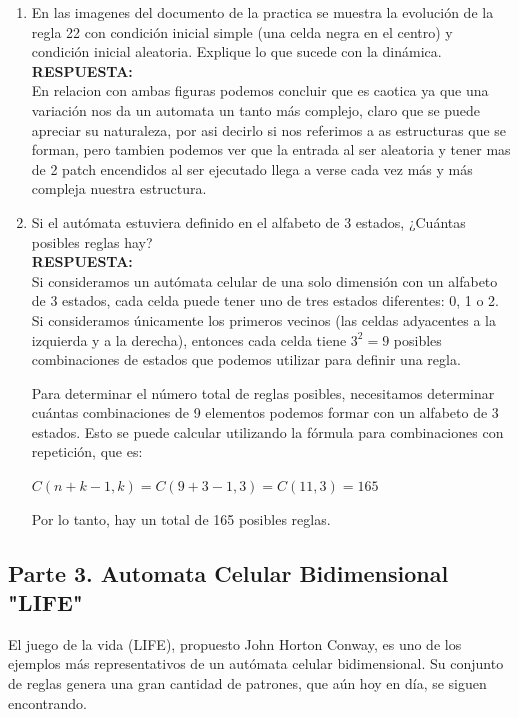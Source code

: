\documentclass[12pt]{article}
\begin{document}
\begin{enumerate}
    \item En las imagenes del documento de la practica se muestra la evolución de la regla 22 con condición inicial simple (una celda negra en el centro) y
    condición inicial aleatoria. Explique lo que sucede con la dinámica.\\
    \textbf{\color{red} RESPUESTA:}\\
    En relacion con ambas figuras podemos concluir que es caotica ya que una variación nos da un automata un tanto más complejo, claro que se puede apreciar su naturaleza, por asi decirlo si nos referimos a as estructuras que se forman,
    pero tambien podemos ver que la entrada al ser aleatoria y tener mas de 2 patch encendidos al ser ejecutado llega a verse cada vez más y más compleja nuestra estructura.

    \item Si el autómata estuviera definido en el alfabeto de 3 estados, ¿Cuántas posibles reglas hay?\\
    \textbf{\color{red} RESPUESTA:}\\
    Si consideramos un autómata celular de una solo dimensión con un alfabeto de 3 estados, cada celda puede tener uno de tres estados diferentes: 0, 1 o 2.
    Si consideramos únicamente los primeros vecinos (las celdas adyacentes a la izquierda y a la derecha), entonces cada celda tiene $3^2 = 9$ posibles combinaciones de estados que podemos utilizar para definir una regla.

Para determinar el número total de reglas posibles, necesitamos determinar cuántas combinaciones de 9 elementos podemos formar con un alfabeto de 3 estados. Esto se puede calcular utilizando la fórmula para combinaciones con repetición, que es:

$C(n + k - 1, k) = C(9 + 3 - 1, 3) = C(11, 3) = 165$

Por lo tanto, hay un total de 165 posibles reglas. 
\end{enumerate}

{\color{blue} \subsection*{Parte 3. Automata Celular Bidimensional "LIFE" }}
\vspace{1em}

El juego de la vida (LIFE), propuesto John Horton Conway, es uno de los
ejemplos más representativos de un autómata celular bidimensional. Su
conjunto de reglas genera una gran cantidad de patrones, que aún hoy en día,
se siguen encontrando.\\
\end{document}
